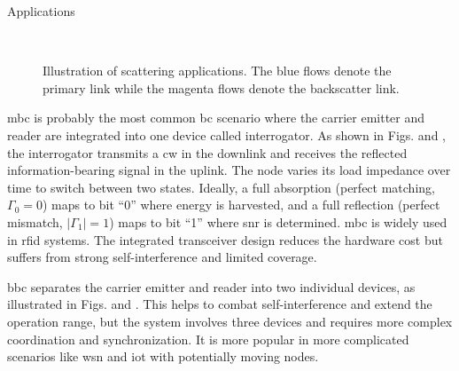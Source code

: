 \begin{section}{}
	\begin{subsection}{Applications}
		\begin{figure}[H]
			\centering
			\\
			\caption{
				Illustration of scattering applications.
				The blue flows denote the primary link while the magenta flows denote the backscatter link.
			}
		\end{figure}

		\begin{subsubsection}{}
			\gls{mbc} is probably the most common \gls{bc} scenario where the carrier emitter and reader are integrated into one device called interrogator.
			As shown in Figs.  and , the interrogator transmits a \gls{cw} in the downlink and receives the reflected information-bearing signal in the uplink.
			The node varies its load impedance over time to switch between two states.
			Ideally, a full absorption (perfect matching, $\Gamma_0 = 0$) maps to bit ``0'' where energy is harvested, and a full reflection (perfect mismatch, $\lvert \Gamma_1 \rvert = 1$) maps to bit ``1'' where \gls{snr} is determined.
			\gls{mbc} is widely used in \gls{rfid} systems.
			The integrated transceiver design reduces the hardware cost but suffers from strong self-interference and limited coverage.
		\end{subsubsection}

		\begin{subsubsection}{}
			\gls{bbc} separates the carrier emitter and reader into two individual devices, as illustrated in Figs.  and .
			This helps to combat self-interference and extend the operation range, but the system involves three devices and requires more complex coordination and synchronization.
			It is more popular in more complicated scenarios like \gls{wsn} and \gls{iot} with potentially moving nodes.
		\end{subsubsection}


\end{subsection}
\end{section}
